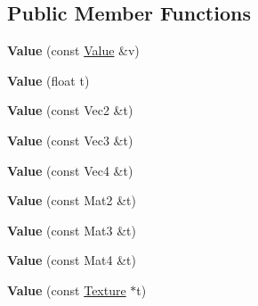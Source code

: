 \subsection*{Public Member Functions}
\begin{DoxyCompactItemize}
\item 
\hypertarget{classg2c_1_1_value_a214a6284cbc21ceb3f33c77d9d3095e1}{
{\bfseries Value} (const \hyperlink{classg2c_1_1_value}{Value} \&v)}
\label{classg2c_1_1_value_a214a6284cbc21ceb3f33c77d9d3095e1}

\item 
\hypertarget{classg2c_1_1_value_a27f95e137ee2aa52896e1ba5946d9eda}{
{\bfseries Value} (float t)}
\label{classg2c_1_1_value_a27f95e137ee2aa52896e1ba5946d9eda}

\item 
\hypertarget{classg2c_1_1_value_a71aa35765d370234bccae9dd535b049d}{
{\bfseries Value} (const Vec2 \&t)}
\label{classg2c_1_1_value_a71aa35765d370234bccae9dd535b049d}

\item 
\hypertarget{classg2c_1_1_value_a4ab8d3d53ed7a56ef9ec88a4aba6b137}{
{\bfseries Value} (const Vec3 \&t)}
\label{classg2c_1_1_value_a4ab8d3d53ed7a56ef9ec88a4aba6b137}

\item 
\hypertarget{classg2c_1_1_value_adc7821a3348e7404daca36662847e9ab}{
{\bfseries Value} (const Vec4 \&t)}
\label{classg2c_1_1_value_adc7821a3348e7404daca36662847e9ab}

\item 
\hypertarget{classg2c_1_1_value_abf509dd8d7ea90cb650d9f00c5ca1a65}{
{\bfseries Value} (const Mat2 \&t)}
\label{classg2c_1_1_value_abf509dd8d7ea90cb650d9f00c5ca1a65}

\item 
\hypertarget{classg2c_1_1_value_ae4d30b1924bfd45b10ce820e50882193}{
{\bfseries Value} (const Mat3 \&t)}
\label{classg2c_1_1_value_ae4d30b1924bfd45b10ce820e50882193}

\item 
\hypertarget{classg2c_1_1_value_a635331bc68f3e58a7f63f25285087d3b}{
{\bfseries Value} (const Mat4 \&t)}
\label{classg2c_1_1_value_a635331bc68f3e58a7f63f25285087d3b}

\item 
\hypertarget{classg2c_1_1_value_ac91de4e0a0e3c7bb832a03ff59a6e9a6}{
{\bfseries Value} (const \hyperlink{classg2c_1_1_texture}{Texture} $\ast$t)}
\label{classg2c_1_1_value_ac91de4e0a0e3c7bb832a03ff59a6e9a6}


\end{DoxyCompactItemize}
